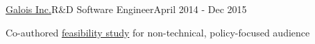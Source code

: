 \documentclass{article}
\newcommand{\LU}[1]{\hspace{-1em}{\bf Technologies : #1}}
\begin{document}
\begin{**mylist}[Security]{\href{http://galois.com}{Galois Inc.}}{R\&D Software Engineer}{April 2014 - Dec 2015}
\item
  Co-authored  \href{https://usvotefoundation-drupal.s3.amazonaws.com/prod/E2EVIV_nontechnical_audience_report.pdf}{feasibility study} for non-technical, policy-focused audience

\end{**mylist}

\end{document}

